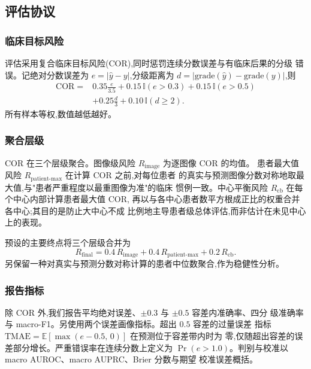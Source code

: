 \subsection{评估协议}

\subsubsection{临床目标风险}

评估采用复合临床目标风险(COR),同时惩罚连续分数误差与有临床后果的分级
错误。记绝对分数误差为 $e = |\hat{y}-y|$,分级距离为
$d = |\mathrm{grade}(\hat{y})-\mathrm{grade}(y)|$,则
\begin{align}
\mathrm{COR} ={}& 0.35\frac{e}{3.5} + 0.15\,\mathbb{I}(e>0.3) + 0.15\,\mathbb{I}(e>0.5) \nonumber\\
             & + 0.25\frac{d}{3} + 0.10\,\mathbb{I}(d\geq2).
\label{eq:cor}
\end{align}
所有样本等权,数值越低越好。

\subsubsection{聚合层级}

COR 在三个层级聚合。图像级风险 $R_{\mathrm{image}}$ 为逐图像 COR 的均值。
患者最大值风险 $R_{\mathrm{patient\text{-}max}}$ 在计算 COR 之前,对每位患者
的真实与预测图像分数对称地取最大值,与"患者严重程度以最重图像为准"的临床
惯例一致。中心平衡风险 $R_{\mathrm{cb}}$ 在每个中心内部计算患者最大值 COR,
再以与各中心患者数平方根成正比的权重合并各中心;其目的是防止大中心不成
比例地主导患者级总体评估,而非估计在未见中心上的表现。

预设的主要终点将三个层级合并为
\begin{equation}
R_{\mathrm{final}} = 0.4\,R_{\mathrm{image}} + 0.4\,R_{\mathrm{patient\text{-}max}}
                   + 0.2\,R_{\mathrm{cb}}.
\label{eq:rfinal}
\end{equation}
另保留一种对真实与预测分数对称计算的患者中位数聚合,作为稳健性分析。

\subsubsection{报告指标}

除 COR 外,我们报告平均绝对误差、$\pm0.3$ 与 $\pm0.5$ 容差内准确率、四分
级准确率与 macro-F1。另使用两个误差画像指标。超出 $0.5$ 容差的过量误差
指标 $\mathrm{TMAE} = \mathbb{E}[\max(e-0.5,\,0)]$ 在预测位于容差带内时为
零,仅随超出容差的误差部分增长。严重错误率在连续分数上定义为
$\Pr(e>1.0)$。判别与校准以 macro AUROC、macro AUPRC、Brier 分数与期望
校准误差概括。

